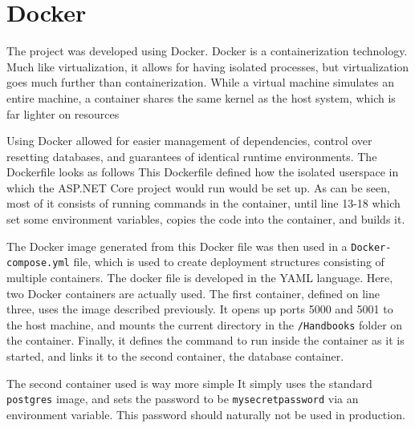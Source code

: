 \section{Docker}
The project was developed using Docker.
Docker is a containerization technology.
Much like virtualization, it allows for having isolated processes, but virtualization goes much further than containerization.
While a virtual machine simulates an entire machine, a container shares the same kernel as the host system, which is far lighter on resources


Using Docker allowed for easier management of dependencies, control over resetting databases, and guarantees of identical runtime environments.
The Dockerfile looks as follows
%
This Dockerfile defined how the isolated userspace in which the ASP.NET Core project would run would be set up.
As can be seen, most of it consists of running commands in the container, until line 13-18 which set some environment variables, copies the code into the container, and builds it.

The Docker image generated from this Docker file was then used in a \texttt{Docker-compose.yml} file, which is used to create deployment structures consisting of multiple containers.
%
The docker file is developed in the YAML language.
Here, two Docker containers are actually used.
The first container, defined on line three, uses the image described previously.
It opens up ports 5000 and 5001 to the host machine, and mounts the current directory in the \texttt{/Handbooks} folder on the container.
Finally, it defines the command to run inside the container as it is started, and links it to the second container, the database container.

The second container used is way more simple
It simply uses the standard \texttt{postgres} image, and sets the password to be \texttt{mysecretpassword} via an environment variable.
This password should naturally not be used in production.

